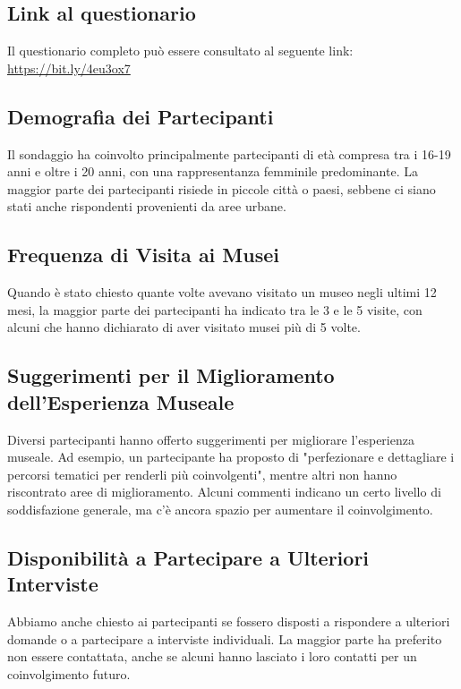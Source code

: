 \documentclass{article}
\begin{document}
\subsection{Link al questionario}

Il questionario completo può essere consultato al seguente link: \url{https://bit.ly/4eu3ox7}

\subsection{Demografia dei Partecipanti}

Il sondaggio ha coinvolto principalmente partecipanti di età compresa tra i 16-19 anni e oltre i 20 anni, con una rappresentanza femminile predominante. La maggior parte dei partecipanti risiede in piccole città o paesi, sebbene ci siano stati anche rispondenti provenienti da aree urbane.

\subsection{Frequenza di Visita ai Musei}

Quando è stato chiesto quante volte avevano visitato un museo negli ultimi 12 mesi, la maggior parte dei partecipanti ha indicato tra le 3 e le 5 visite, con alcuni che hanno dichiarato di aver visitato musei più di 5 volte.

\subsection{Suggerimenti per il Miglioramento dell'Esperienza Museale}

Diversi partecipanti hanno offerto suggerimenti per migliorare l'esperienza museale. Ad esempio, un partecipante ha proposto di "perfezionare e dettagliare i percorsi tematici per renderli più coinvolgenti", mentre altri non hanno riscontrato aree di miglioramento. Alcuni commenti indicano un certo livello di soddisfazione generale, ma c'è ancora spazio per aumentare il coinvolgimento.

\subsection{Disponibilità a Partecipare a Ulteriori Interviste}

Abbiamo anche chiesto ai partecipanti se fossero disposti a rispondere a ulteriori domande o a partecipare a interviste individuali. La maggior parte ha preferito non essere contattata, anche se alcuni hanno lasciato i loro contatti per un coinvolgimento futuro.
\end{document}
